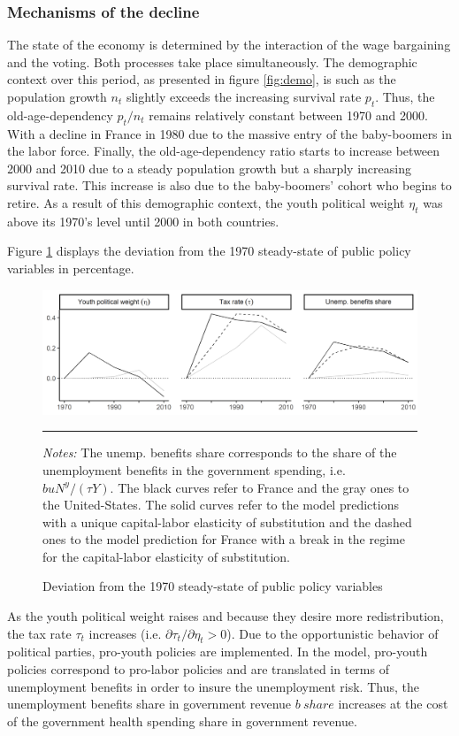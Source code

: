 \subsubsection{Mechanisms of the decline}

The state of the economy is determined by the interaction of the wage bargaining and the voting. Both processes take place simultaneously. The demographic context over this period, as presented in figure \ref{fig:demo}, is such as the population growth $n_t$ slightly exceeds the increasing survival rate $p_t$. Thus, the old-age-dependency $p_t/n_t$ remains relatively constant between 1970 and 2000. With a decline in France in 1980 due to the massive entry of the baby-boomers in the labor force. Finally, the old-age-dependency ratio starts to increase between 2000 and 2010 due to a steady population growth but a sharply increasing survival rate. This increase is also due to the baby-boomers' cohort who begins to retire. As a result of this demographic context, the youth political weight $\eta_t$ was above its 1970's level until 2000 in both countries.

Figure \ref{fig:dev_public7010} displays the deviation from the 1970 steady-state of public policy variables in percentage.
\begin{figure}[tb]
	\centering
	\includegraphics[width=1\linewidth]{../result/deviation/dev_public7010.png}
	\caption{Deviation from the 1970 steady-state of public policy variables}
	\label{fig:dev_public7010}
	\vspace{.5ex}
	\hrule
	\vspace{-4ex}
 	\justify\singlespacing\footnotesize \textit{Notes:} The unemp. benefits share corresponds to the share of the unemployment benefits in the government spending, i.e. $buN^y/(\tau Y)$. The black curves refer to France and the gray ones to the United-States. The solid curves refer to the model predictions with a unique capital-labor elasticity of substitution and the dashed ones to the model prediction for France with a break in the regime for the capital-labor elasticity of substitution.
\end{figure}
As the youth political weight raises and because they desire more redistribution, the tax rate $\tau_t$ increases (i.e. $\partial \tau_t / \partial \eta_t > 0$). Due to the opportunistic behavior of political parties, pro-youth policies are implemented. In the model, pro-youth policies correspond to pro-labor policies and are translated in terms of unemployment benefits in order to insure the unemployment risk. Thus, the unemployment benefits share in government revenue $b~share$ increases at the cost of the government health spending share in government revenue.

